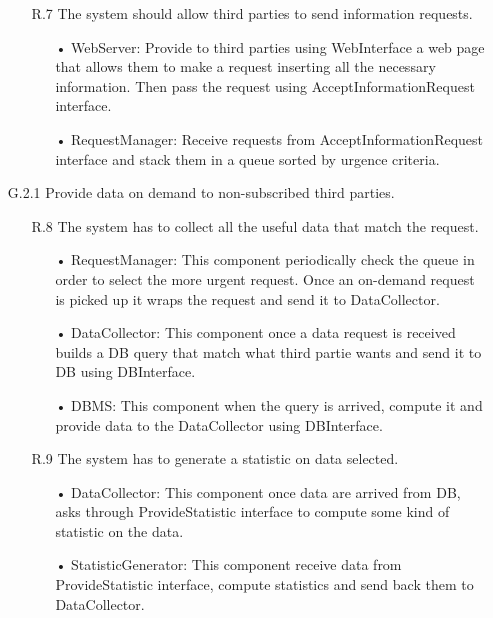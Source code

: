 \begin{enumerate}
\begin{enumerate}
	\item [R.7] The system should allow third parties to send information requests.
		\begin{enumerate}
		\item[•] WebServer: Provide to third parties using WebInterface a web page that allows them to make a request inserting all the necessary information. Then pass the request using AcceptInformationRequest interface.
		\item[•] RequestManager: Receive requests from AcceptInformationRequest interface and stack them in a queue sorted by urgence criteria.
		\end{enumerate}	
	\end{enumerate}

\item [G.2.1] Provide data on demand to non-subscribed third parties.
	\begin{enumerate}
	\item [R.8] The system has to collect all the useful data that match the request.
		\begin{enumerate}
		\item[•] RequestManager: This component periodically check the queue in order to select the more urgent request. Once an on-demand request is picked up it wraps the request and send it to DataCollector.
		\item[•] DataCollector: This component once a data request is received builds a DB query that match what third partie wants and send it to DB using DBInterface.
		\item[•] DBMS: This component when the query is arrived, compute it and provide data to the DataCollector using DBInterface.
		\end{enumerate}	
			
	\item [R.9 ] The system has to generate a statistic on data selected.
		\begin{enumerate}
		\item[•] DataCollector: This component once data are arrived from DB, asks through ProvideStatistic interface to compute some kind of statistic on the data.
		\item[•] StatisticGenerator: This component receive data from ProvideStatistic interface, compute statistics and send back them to DataCollector.
		\end{enumerate}	
		

\end{enumerate}
\end{enumerate}
